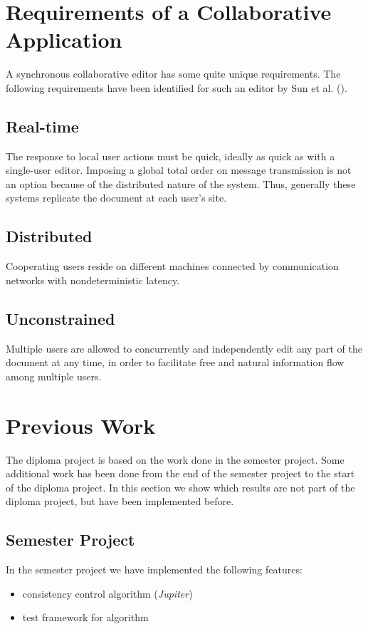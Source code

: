 \section{Requirements of a Collaborative Application}
A synchronous collaborative editor has some quite unique requirements.
The following requirements have been identified for such an editor
by Sun et al. (\cite{sun98a}).

\subsection{Real-time} 
The response to local user actions must be quick, ideally
as quick as with a single-user editor. Imposing a global total order on
message transmission is not
an option because of the distributed nature of the system. Thus, generally 
these systems replicate the document at each user's site.

\subsection{Distributed} 
Cooperating users reside on different machines 
connected by communication networks with nondeterministic latency.

\subsection{Unconstrained} 
Multiple users are allowed to concurrently and
independently edit any part of the document at any time, in order to 
facilitate free and natural information flow among multiple users.



\section{Previous Work}
\label{sect:overview.previouswork}

The diploma project is based on the work done in the semester project. Some
additional work has been done from the end of the semester
project to the start of the diploma project. In this section we show which
results are not part of the diploma project, but have been implemented
before.

\subsection{Semester Project}
In the semester project we have implemented the following features:
\begin{itemize}
 \item consistency control algorithm (\emph{Jupiter})
 \item test framework for algorithm
\end{itemize}

